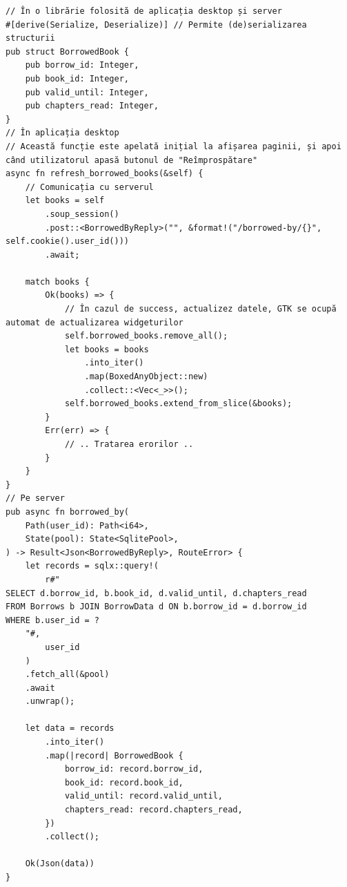 \documentclass{article}
\begin{document}
    \begin{verbatim}
// În o librărie folosită de aplicația desktop și server
#[derive(Serialize, Deserialize)] // Permite (de)serializarea structurii
pub struct BorrowedBook {
    pub borrow_id: Integer,
    pub book_id: Integer,
    pub valid_until: Integer,
    pub chapters_read: Integer,
}
// În aplicația desktop
// Această funcție este apelată inițial la afișarea paginii, și apoi când utilizatorul apasă butonul de "Reîmprospătare"
async fn refresh_borrowed_books(&self) {
    // Comunicația cu serverul
    let books = self
        .soup_session()
        .post::<BorrowedByReply>("", &format!("/borrowed-by/{}", self.cookie().user_id()))
        .await;

    match books {
        Ok(books) => {
            // În cazul de success, actualizez datele, GTK se ocupă automat de actualizarea widgeturilor
            self.borrowed_books.remove_all();
            let books = books
                .into_iter()
                .map(BoxedAnyObject::new)
                .collect::<Vec<_>>();
            self.borrowed_books.extend_from_slice(&books);
        }
        Err(err) => {
            // .. Tratarea erorilor ..
        }
    }
}
// Pe server
pub async fn borrowed_by(
    Path(user_id): Path<i64>,
    State(pool): State<SqlitePool>,
) -> Result<Json<BorrowedByReply>, RouteError> {
    let records = sqlx::query!(
        r#"
SELECT d.borrow_id, b.book_id, d.valid_until, d.chapters_read
FROM Borrows b JOIN BorrowData d ON b.borrow_id = d.borrow_id
WHERE b.user_id = ?
    "#,
        user_id
    )
    .fetch_all(&pool)
    .await
    .unwrap();

    let data = records
        .into_iter()
        .map(|record| BorrowedBook {
            borrow_id: record.borrow_id,
            book_id: record.book_id,
            valid_until: record.valid_until,
            chapters_read: record.chapters_read,
        })
        .collect();

    Ok(Json(data))
}
    \end{verbatim}
\end{document}
